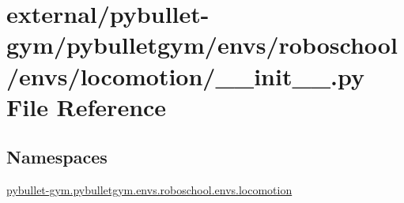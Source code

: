 \hypertarget{external_2pybullet-gym_2pybulletgym_2envs_2roboschool_2envs_2locomotion_2____init_____8py}{}\section{external/pybullet-\/gym/pybulletgym/envs/roboschool/envs/locomotion/\+\_\+\+\_\+init\+\_\+\+\_\+.py File Reference}
\label{external_2pybullet-gym_2pybulletgym_2envs_2roboschool_2envs_2locomotion_2____init_____8py}
\subsection*{Namespaces}
\begin{DoxyCompactItemize}
\item 
 \hyperlink{namespacepybullet-gym_1_1pybulletgym_1_1envs_1_1roboschool_1_1envs_1_1locomotion}{pybullet-\/gym.\+pybulletgym.\+envs.\+roboschool.\+envs.\+locomotion}
\end{DoxyCompactItemize}
